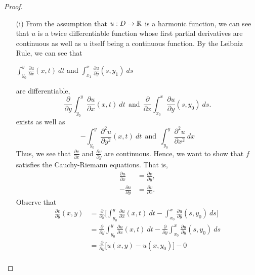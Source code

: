 \documentclass[a4paper]{article}
\begin{document}
\begin{proof}
    \begin{enumerate}
        \item[(i)] From the assumption that \( u: D \to \mathbb{R}  \) is a harmonic function, we can see that \( u  \) is a twice differentiable function whose first partial derivatives are continuous as well as \( u  \) itself being a continuous function. By the Leibniz Rule, we can see that 
            \begin{center}
                \( \displaystyle \int_{{y}_{0}}^{y}  \frac{\partial u }{\partial x } (x,t) \ d t  \) and \( \displaystyle \int_{{x}_{1}}^{x} \frac{\partial u }{\partial y } (s,{y}_{1})  \ ds \)
            \end{center}
            are differentiable,  
            \[  \frac{\partial  }{\partial y }  \int_{ {y}_{0} }^{ y } \frac{\partial u }{\partial x } (x,t)  \ dt \ \ \text{and} \ \ \frac{\partial  }{\partial x }  \int_{ {x}_{0} }^{ x } \frac{\partial u }{\partial y } (s, {y}_{0}) \ ds. \]
            exists as well as 
            \[ -\int_{ {y}_{0} }^{ y }  \frac{\partial^{2} u  }{\partial y^{2} } (x,t) \ dt \ \ \text{and} \ \  \int_{ {y}_{0} }^{ y }  \frac{\partial ^{2} u  }{\partial  x^{2} }  \ dx \]
            Thus, we see that \( \displaystyle \frac{\partial v }{\partial x }  \) and \( \displaystyle \frac{\partial v }{\partial y }  \) are continuous. Hence, we want to show that \( f  \) satisfies the Cauchy-Riemann equations. That is,   
            \begin{align*}
                \frac{\partial u }{\partial x }  &= \frac{\partial v }{\partial y }, \tag{1}  \\
                -\frac{\partial u }{\partial y }  &= \frac{\partial v }{\partial x }. \tag{2}
            \end{align*}
            Observe that
            \begin{align*}
                \frac{\partial v }{\partial y }(x,y)  &= \frac{\partial  }{\partial y } \Big[ \int_{ {y}_{0} }^{ y }  \frac{\partial u }{\partial x } (x,t) \ dt - \int_{ {x}_{0} }^{ x }  \frac{\partial u }{\partial y } (s, {y}_{0}) \ ds \Big]  \\
                                                 &= \frac{\partial  }{\partial y }  \int_{ {y}_{0} }^{ y }  \frac{\partial u }{\partial x } (x,t) \ dt - \frac{\partial  }{\partial y }  \int_{ {x}_{0} }^{ x }  \frac{\partial u }{\partial y }  (s,{y}_{0}) \ ds \\
                                                 &= \frac{\partial  }{\partial y }  \Big[ u(x,y) - u(x,{y}_{0})\Big] - 0 \\

\end{align*}
\end{enumerate}
\end{proof}
\end{document}
